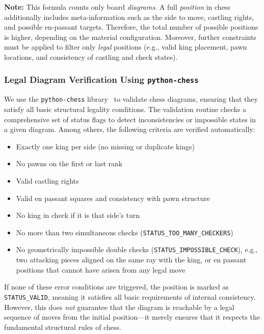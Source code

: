 \documentclass[12pt]{article}
\begin{document}
\noindent
\textbf{Note:}  
This formula counts only board \emph{diagrams}.  
A full \emph{position} in chess additionally includes meta-information such as the side to move, castling rights, and possible en-passant targets.  
Therefore, the total number of possible positions is higher, depending on the material configuration.  
Moreover, further constraints must be applied to filter only \emph{legal} positions (e.g., valid king placement, pawn locations, and consistency of castling and check states).

\subsubsection{Legal Diagram Verification Using \texttt{python-chess}}

We use the \texttt{python-chess} library~\cite{python-chess} to validate chess diagrams, ensuring that they satisfy all basic structural legality conditions. 
The validation routine checks a comprehensive set of status flags to detect inconsistencies or impossible states in a given diagram. 
Among others, the following criteria are verified automatically:

\begin{itemize}
    \item Exactly one king per side (no missing or duplicate kings)
    \item No pawns on the first or last rank
    \item Valid castling rights
    \item Valid en passant squares and consistency with pawn structure
    \item No king in check if it is that side’s turn
    \item No more than two simultaneous checks (\texttt{STATUS\_TOO\_MANY\_CHECKERS})
    \item No geometrically impossible double checks (\texttt{STATUS\_IMPOSSIBLE\_CHECK}), 
          e.g., two attacking pieces aligned on the same ray with the king,
          or en passant positions that cannot have arisen from any legal move
\end{itemize}

\noindent
If none of these error conditions are triggered, the position is marked as 
\texttt{STATUS\_VALID}, meaning it satisfies all basic requirements of internal consistency.
However, this does \emph{not} guarantee that the diagram is reachable by a legal sequence of moves from the initial position---it merely ensures that it respects the fundamental structural rules of chess.
\end{document}
